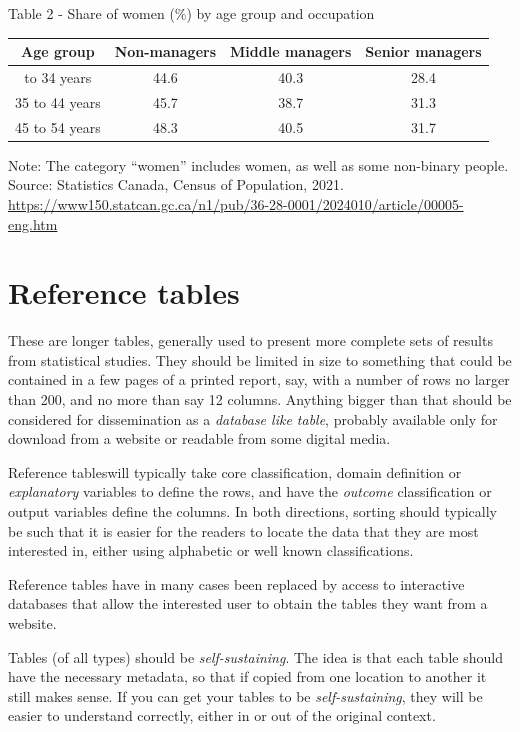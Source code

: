 \documentclass[
  12pt,
]{book}
\begin{document}
Table 2 - Share of women (\%) by age group and occupation

\begin{longtable}[]{@{}cccc@{}}
\toprule\noalign{}
Age group & Non-managers & Middle managers & Senior managers \\
\midrule\noalign{}
\endhead
\bottomrule\noalign{}
\endlastfoot
25 to 34 years & 44.6 & 40.3 & 28.4 \\
35 to 44 years & 45.7 & 38.7 & 31.3 \\
45 to 54 years & 48.3 & 40.5 & 31.7 \\
\end{longtable}

Note: The category ``women'' includes women, as well as some non-binary people. Source: Statistics Canada, Census of Population, 2021. \url{https://www150.statcan.gc.ca/n1/pub/36-28-0001/2024010/article/00005-eng.htm}

\hypertarget{reference-tables}{%
\section{Reference tables}\label{reference-tables}}

These are longer tables, generally used to present more complete sets of results from statistical studies. They should be limited in size to something that could be contained in a few pages of a printed report, say, with a number of rows no larger than 200, and no more than say 12 columns. Anything bigger than that should be considered for dissemination as a \emph{database like table}, probably available only for download from a website or readable from some digital media.

Reference tableswill typically take core classification, domain definition or \emph{explanatory} variables to define the rows, and have the \emph{outcome} classification or output variables define the columns. In both directions, sorting should typically be such that it is easier for the readers to locate the data that they are most interested in, either using alphabetic or well known classifications.

Reference tables have in many cases been replaced by access to interactive databases that allow the interested user to obtain the tables they want from a website.

Tables (of all types) should be \emph{self-sustaining}. The idea is that each table should have the necessary metadata, so that if copied from one location to another it still makes sense. If you can get your tables to be \emph{self-sustaining}, they will be easier to understand correctly, either in or out of the original context.
\end{document}
